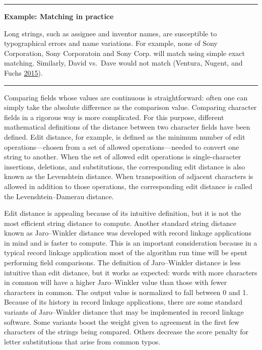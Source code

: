 \documentclass[]{krantz}
\begin{document}
\begin{center}\rule{0.5\linewidth}{\linethickness}\end{center}

\textbf{Example: Matching in practice}

Long strings, such as assignee and inventor names, are susceptible to
typographical errors and name variations. For example, none of Sony
Corporation, Sony Corporatoin and Sony Corp. will match using simple
exact matching. Similarly, David vs.~Dave would not match (Ventura,
Nugent, and Fuchs \protect\hyperlink{ref-ventura2015seeing}{2015}).

\begin{center}\rule{0.5\linewidth}{\linethickness}\end{center}

Comparing fields whose values are continuous is straightforward: often
one can simply take the absolute difference as the comparison value.
Comparing character fields in a rigorous way is more complicated. For
this purpose, different mathematical definitions of the distance between
two character fields have been defined. Edit distance, for example, is
defined as the minimum number of edit operations---chosen from a set of
allowed operations---needed to convert one string to another. When the
set of allowed edit operations is single-character insertions,
deletions, and substitutions, the corresponding edit distance is also
known as the Levenshtein distance. When transposition of adjacent
characters is allowed in addition to those operations, the corresponding
edit distance is called the Levenshtein--Damerau distance.

Edit distance is appealing because of its intuitive definition, but it
is not the most efficient string distance to compute. Another standard
string distance known as Jaro--Winkler distance was developed with
record linkage applications in mind and is faster to compute. This is an
important consideration because in a typical record linkage application
most of the algorithm run time will be spent performing field
comparisons. The definition of Jaro--Winkler distance is less intuitive
than edit distance, but it works as expected: words with more characters
in common will have a higher Jaro--Winkler value than those with fewer
characters in common. The output value is normalized to fall between 0
and 1. Because of its history in record linkage applications, there are
some standard variants of Jaro--Winkler distance that may be implemented
in record linkage software. Some variants boost the weight given to
agreement in the first few characters of the strings being compared.
Others decrease the score penalty for letter substitutions that arise
from common typos.
\end{document}
